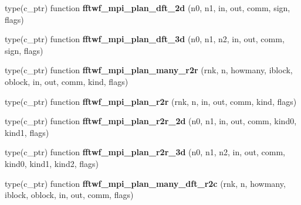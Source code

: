 \begin{DoxyCompactItemize}
\item 
type(c\+\_\+ptr) function {\bfseries fftwf\+\_\+mpi\+\_\+plan\+\_\+dft\+\_\+2d} (n0, n1, in, out, comm, sign, flags)\hypertarget{interfacefftw3_1_1fftw__mpi__plan__gen_a4f82da81a25a66c27f664ffa69a50885}{}\label{interfacefftw3_1_1fftw__mpi__plan__gen_a4f82da81a25a66c27f664ffa69a50885}

\item 
type(c\+\_\+ptr) function {\bfseries fftwf\+\_\+mpi\+\_\+plan\+\_\+dft\+\_\+3d} (n0, n1, n2, in, out, comm, sign, flags)\hypertarget{interfacefftw3_1_1fftw__mpi__plan__gen_aa8679d8e6e0c0de2ebd975a302fd0b67}{}\label{interfacefftw3_1_1fftw__mpi__plan__gen_aa8679d8e6e0c0de2ebd975a302fd0b67}

\item 
type(c\+\_\+ptr) function {\bfseries fftwf\+\_\+mpi\+\_\+plan\+\_\+many\+\_\+r2r} (rnk, n, howmany, iblock, oblock, in, out, comm, kind, flags)\hypertarget{interfacefftw3_1_1fftw__mpi__plan__gen_a1eeb351fd3f59dbb898a9ea7ca8798fa}{}\label{interfacefftw3_1_1fftw__mpi__plan__gen_a1eeb351fd3f59dbb898a9ea7ca8798fa}

\item 
type(c\+\_\+ptr) function {\bfseries fftwf\+\_\+mpi\+\_\+plan\+\_\+r2r} (rnk, n, in, out, comm, kind, flags)\hypertarget{interfacefftw3_1_1fftw__mpi__plan__gen_ac6103b233f50cfc34a40a1b77304a5da}{}\label{interfacefftw3_1_1fftw__mpi__plan__gen_ac6103b233f50cfc34a40a1b77304a5da}

\item 
type(c\+\_\+ptr) function {\bfseries fftwf\+\_\+mpi\+\_\+plan\+\_\+r2r\+\_\+2d} (n0, n1, in, out, comm, kind0, kind1, flags)\hypertarget{interfacefftw3_1_1fftw__mpi__plan__gen_aea576443f7528457bb1c822fb50db5c5}{}\label{interfacefftw3_1_1fftw__mpi__plan__gen_aea576443f7528457bb1c822fb50db5c5}

\item 
type(c\+\_\+ptr) function {\bfseries fftwf\+\_\+mpi\+\_\+plan\+\_\+r2r\+\_\+3d} (n0, n1, n2, in, out, comm, kind0, kind1, kind2, flags)\hypertarget{interfacefftw3_1_1fftw__mpi__plan__gen_ab7d3fa0c327a59b4160a13276becec2f}{}\label{interfacefftw3_1_1fftw__mpi__plan__gen_ab7d3fa0c327a59b4160a13276becec2f}

\item 
type(c\+\_\+ptr) function {\bfseries fftwf\+\_\+mpi\+\_\+plan\+\_\+many\+\_\+dft\+\_\+r2c} (rnk, n, howmany, iblock, oblock, in, out, comm, flags)\hypertarget{interfacefftw3_1_1fftw__mpi__plan__gen_adad0cabd6304e11071b79688560b34ec}{}\label{interfacefftw3_1_1fftw__mpi__plan__gen_adad0cabd6304e11071b79688560b34ec}


\end{DoxyCompactItemize}
